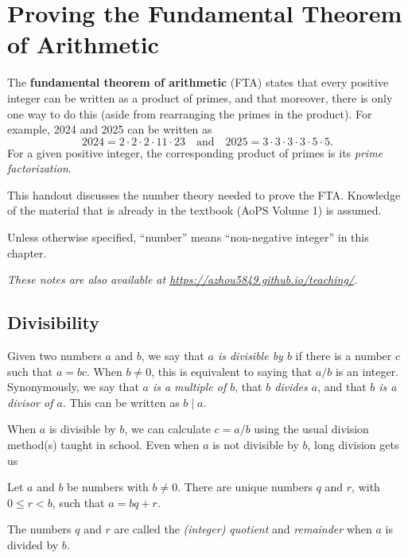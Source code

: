\section{Proving the Fundamental Theorem of Arithmetic}

The \textbf{fundamental theorem of arithmetic} (FTA) states that every positive integer can be written as a product of primes, and that moreover, there is only one way to do this (aside from rearranging the primes in the product). For example, 2024 and 2025 can be written as
\begin{equation*}
2024 = 2\cdot 2\cdot 2\cdot 11\cdot 23\quad\text{and}\quad 2025 = 3\cdot 3\cdot 3\cdot 3\cdot 5\cdot 5.
\end{equation*}
For a given positive integer, the corresponding product of primes is its \emph{prime factorization}.

This handout discusses the number theory needed to prove the FTA. Knowledge of the material that is already in the textbook (AoPS Volume 1) is assumed.

\begin{convention}
Unless otherwise specified, ``number'' means ``non-negative integer'' in this chapter.
\end{convention}

\textit{These notes are also available at \url{https://azhou5849.github.io/teaching/}.}


\subsection{Divisibility}

Given two numbers $a$ and $b$, we say that \emph{$a$ is divisible by $b$} if there is a number $c$ such that $a = bc$. When $b\neq 0$, this is equivalent to saying that $a/b$ is an integer. Synonymously, we say that \emph{$a$ is a multiple of $b$}, that \emph{$b$ divides $a$}, and that \emph{$b$ is a divisor of $a$}. This can be written as $b\mid a$.

When $a$ is divisible by $b$, we can calculate $c = a/b$ using the usual division method(s) taught in school. Even when $a$ is not divisible by $b$, long division gets us
\begin{proposition}\label{prop:div-algo}
Let $a$ and $b$ be numbers with $b\neq 0$. There are unique numbers $q$ and $r$, with $0\leq r < b$, such that $a = bq + r$.
\end{proposition}
The numbers $q$ and $r$ are called the \emph{(integer) quotient} and \emph{remainder} when $a$ is divided by $b$.


